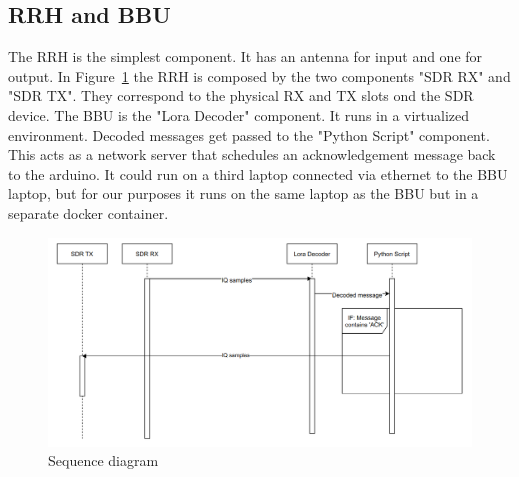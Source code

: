 \subsection{RRH and BBU}
The RRH is the simplest component. It has an antenna for input and one for output. In Figure~\ref{fig:seq_diagram} the RRH is composed by the two 
components "SDR RX" and "SDR TX". They correspond to the physical RX and TX slots ond the SDR device. The BBU is the "Lora Decoder" component. It runs 
in a virtualized environment. Decoded messages get passed to the "Python Script" component. This acts as a network server that schedules an acknowledgement
message back to the arduino. It could run on a third laptop connected via ethernet to the BBU laptop, but for our purposes it runs on the same laptop
as the BBU but in a separate docker container.
\begin{figure}[h]
    \centering
    \includegraphics[width=1\textwidth]{figures/seq_diagram.png}
    \caption{Sequence diagram}
    \label{fig:seq_diagram}
\end{figure}


